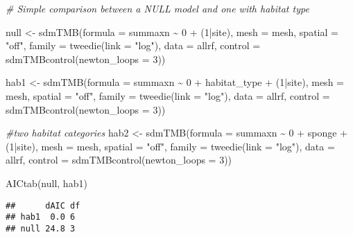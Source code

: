 \documentclass[
]{article}
\newenvironment{Shaded}{\begin{snugshade}}{\end{snugshade}}
\newcommand{\AttributeTok}[1]{\textcolor[rgb]{0.77,0.63,0.00}{#1}}
\newcommand{\CommentTok}[1]{\textcolor[rgb]{0.56,0.35,0.01}{\textit{#1}}}
\newcommand{\DecValTok}[1]{\textcolor[rgb]{0.00,0.00,0.81}{#1}}
\newcommand{\FunctionTok}[1]{\textcolor[rgb]{0.00,0.00,0.00}{#1}}
\newcommand{\NormalTok}[1]{#1}
\newcommand{\OtherTok}[1]{\textcolor[rgb]{0.56,0.35,0.01}{#1}}
\newcommand{\SpecialCharTok}[1]{\textcolor[rgb]{0.00,0.00,0.00}{#1}}
\newcommand{\StringTok}[1]{\textcolor[rgb]{0.31,0.60,0.02}{#1}}
\begin{document}
\begin{Shaded}
\begin{Highlighting}[]
\CommentTok{\# Simple comparison between a NULL model and one with habitat type}

\NormalTok{null }\OtherTok{\textless{}{-}} \FunctionTok{sdmTMB}\NormalTok{(}\AttributeTok{formula =}\NormalTok{ summaxn }\SpecialCharTok{\textasciitilde{}} \DecValTok{0} \SpecialCharTok{+}\NormalTok{ (}\DecValTok{1}\SpecialCharTok{|}\NormalTok{site), }\AttributeTok{mesh =}\NormalTok{ mesh, }\AttributeTok{spatial =} \StringTok{"off"}\NormalTok{, }\AttributeTok{family =} \FunctionTok{tweedie}\NormalTok{(}\AttributeTok{link =} \StringTok{"log"}\NormalTok{), }
            \AttributeTok{data =}\NormalTok{ allrf, }\AttributeTok{control =} \FunctionTok{sdmTMBcontrol}\NormalTok{(}\AttributeTok{newton\_loops =} \DecValTok{3}\NormalTok{))}

\NormalTok{hab1 }\OtherTok{\textless{}{-}} \FunctionTok{sdmTMB}\NormalTok{(}\AttributeTok{formula =}\NormalTok{ summaxn }\SpecialCharTok{\textasciitilde{}} \DecValTok{0} \SpecialCharTok{+}\NormalTok{ habitat\_type }\SpecialCharTok{+}\NormalTok{ (}\DecValTok{1}\SpecialCharTok{|}\NormalTok{site), }\AttributeTok{mesh =}\NormalTok{ mesh, }\AttributeTok{spatial =} \StringTok{"off"}\NormalTok{, }\AttributeTok{family =} \FunctionTok{tweedie}\NormalTok{(}\AttributeTok{link =} \StringTok{"log"}\NormalTok{), }\AttributeTok{data =}\NormalTok{ allrf, }\AttributeTok{control =} \FunctionTok{sdmTMBcontrol}\NormalTok{(}\AttributeTok{newton\_loops =} \DecValTok{3}\NormalTok{))}

\CommentTok{\#two habitat categories}
\NormalTok{hab2 }\OtherTok{\textless{}{-}} \FunctionTok{sdmTMB}\NormalTok{(}\AttributeTok{formula =}\NormalTok{ summaxn }\SpecialCharTok{\textasciitilde{}} \DecValTok{0} \SpecialCharTok{+}\NormalTok{ sponge }\SpecialCharTok{+}\NormalTok{ (}\DecValTok{1}\SpecialCharTok{|}\NormalTok{site), }\AttributeTok{mesh =}\NormalTok{ mesh, }\AttributeTok{spatial =} \StringTok{"off"}\NormalTok{, }\AttributeTok{family =} \FunctionTok{tweedie}\NormalTok{(}\AttributeTok{link =} \StringTok{"log"}\NormalTok{), }\AttributeTok{data =}\NormalTok{ allrf, }\AttributeTok{control =} \FunctionTok{sdmTMBcontrol}\NormalTok{(}\AttributeTok{newton\_loops =} \DecValTok{3}\NormalTok{))}

\FunctionTok{AICtab}\NormalTok{(null, hab1)}
\end{Highlighting}
\end{Shaded}

\begin{verbatim}
##      dAIC df
## hab1  0.0 6 
## null 24.8 3
\end{verbatim}
\end{document}
